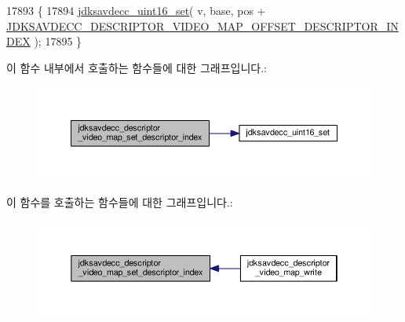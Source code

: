 \begin{DoxyCode}
17893 \{
17894     \hyperlink{group__endian_ga14b9eeadc05f94334096c127c955a60b}{jdksavdecc\_uint16\_set}( v, base, pos + 
      \hyperlink{group__descriptor__video__map_ga71fcc2873352c7ac3d61d03a65606d94}{JDKSAVDECC\_DESCRIPTOR\_VIDEO\_MAP\_OFFSET\_DESCRIPTOR\_INDEX}
       );
17895 \}
\end{DoxyCode}


이 함수 내부에서 호출하는 함수들에 대한 그래프입니다.\+:
\nopagebreak
\begin{figure}[H]
\begin{center}
\leavevmode
\includegraphics[width=350pt]{group__descriptor__video__map_ga855bc95bb9268073111c983176bf61c9_cgraph}
\end{center}
\end{figure}




이 함수를 호출하는 함수들에 대한 그래프입니다.\+:
\nopagebreak
\begin{figure}[H]
\begin{center}
\leavevmode
\includegraphics[width=350pt]{group__descriptor__video__map_ga855bc95bb9268073111c983176bf61c9_icgraph}
\end{center}
\end{figure}


